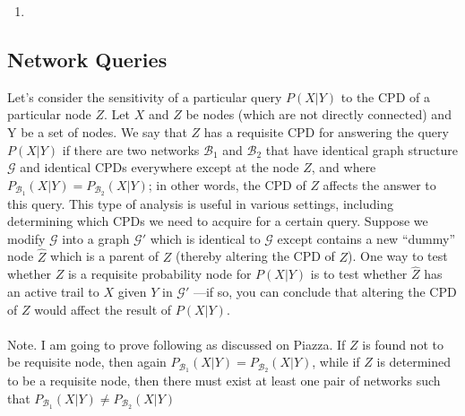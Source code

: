 \documentclass[12pt]{article}
\begin{document}
\begin{enumerate}

	\item

\end{enumerate}

\subsection{Network Queries}
Let’s consider the sensitivity of a particular query $P(X|Y)$ to the CPD of a particular node $Z$.
Let $X$ and $Z$ be nodes (which are not directly connected) and Y be a set of nodes. We say that $Z$ has a requisite CPD for answering the query $P(X|Y)$ if there are two networks $\mathcal{B}_1$ and $\mathcal{B}_2$
that have identical graph structure $\mathcal{G}$ and identical CPDs everywhere except at the node $Z$, and
where $P_{\mathcal{B}_1}(X|Y) = P_{\mathcal{B}_2}(X|Y)$; in other words, the CPD of $Z$ affects the answer to this query.
This type of analysis is useful in various settings, including determining which CPDs we need
to acquire for a certain query.
Suppose we modify $\mathcal{G}$ into a graph $\mathcal{G}'$
which is identical to $\mathcal{G}$ except contains a new ``dummy''
node $\hat{Z}$ which is a parent of $Z$ (thereby altering the CPD of $Z$). One way to test whether $Z$ is
a requisite probability node for $P(X|Y)$ is to test whether $\hat{Z}$ has an active trail to $X$ given $Y$
in $\mathcal{G}'$ 	—if so, you can conclude that altering the CPD of $Z$ would aﬀect the result of $P(X|Y)$.  \\ \\
		Note. I am going to prove following as  discussed on Piazza. If $Z$ is found not to be requisite node, then again $P_{\mathcal{B}_1}(X|Y) = P_{\mathcal{B}_2}(X|Y)$, while if $Z$ is determined to be a requisite node, then there must exist at least one pair of networks such that $P_{\mathcal{B}_1}(X|Y) \not = P_{\mathcal{B}_2}(X|Y)$
\end{document}

